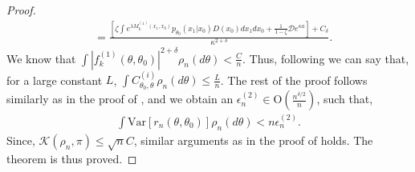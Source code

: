 \documentclass[11pt]{amsart}
\newcommand{\Var}{\mathrm{Var}}
\newcommand{\loglik}{r_n(\theta,\theta_0)}
\begin{document}
\begin{proof}
\begin{align*}
     & = \frac{\left[ \zeta\int e^{\lambda M^{(1)}_k(x_1,x_{0})}p_{\theta_0}(x_1|x_0)D(x_0)dx_1dx_0+\frac{1}{1-\zeta}\mathcal{D}e^{\kappa a}\right] +C_{\delta}}{\kappa^{2+\delta}}.
\end{align*}
We know that $\int |f^{(1)}_k(\theta,\theta_0)|^{2+\delta}\rho_n(d\theta)<\frac{C}{n}$. Thus, following  we can say that, for a large constant $L$, $\int C_{\theta_0,\theta}^{(i)} \rho_n(d\theta) \leq \frac{L}{n}$. The rest of the proof follows similarly as in the proof of , and we obtain an $\epsilon^{(2)}_n\in \mathrm{O}(\frac{n^{\delta/2}}{n})$, such that,
\begin{align*}
    \int \Var[\loglik]\rho_n(d\theta) < n\epsilon^{(2)}_n.
\end{align*}
Since, $\mathcal{K}(\rho_n,\pi)\leq \sqrt{n}C$, similar arguments as in the proof of  holds. The theorem is thus proved. 
\end{proof}
\end{document}
